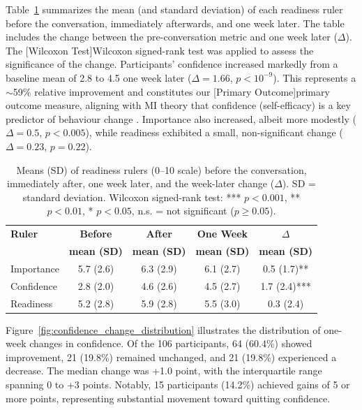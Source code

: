 Table~\ref{table:mibot_ruler_summary} summarizes the mean (and standard deviation) of each readiness ruler before the conversation, immediately afterwards, and one week later.   The table includes the change between the pre-conversation metric and one week later ($\Delta$). The [Wilcoxon Test]Wilcoxon signed-rank test was applied to assess the significance of the change. Participants' confidence increased markedly from a baseline mean of 2.8 to 4.5 one week later ($\Delta=1.66$, $p<10^{-9}$). This represents a $\sim$59\% relative improvement and constitutes our [Primary Outcome]primary outcome measure, aligning with MI theory that confidence (self-efficacy) is a key predictor of behaviour change \citep{Gwaltney2009-wj,Abar2013}. Importance also increased, albeit more modestly ($\Delta=0.5$, $p<0.005$), while readiness exhibited a small, non-significant change ($\Delta=0.23$, $p=0.22$).

\begin{table}[ht!]
  \centering
  \small
  \setlength{\tabcolsep}{4pt}
  \renewcommand{\arraystretch}{1.1}
  \begin{tabular}{@{}lcccc@{}}
    \toprule
    \textbf{Ruler} & \textbf{Before} & \textbf{After} & \textbf{One Week} & \textbf{$\Delta$} \\
    & \textbf{mean (SD)} & \textbf{mean (SD)} & \textbf{mean (SD)} & \textbf{mean (SD)} \\
    \midrule
    Importance & 5.7 (2.6) & 6.3 (2.9) & 6.1 (2.7) & 0.5 (1.7)** \\
    Confidence & 2.8 (2.0) & 4.6 (2.6) & 4.5 (2.7) & 1.7 (2.4)*** \\
    Readiness  & 5.2 (2.8) & 5.9 (2.8) & 5.5 (3.0) & 0.3 (2.4) \\
    \bottomrule
  \end{tabular}
  \caption{Means (SD) of readiness rulers (0--10 scale) before the conversation, immediately after, one week later, and the week-later change ($\Delta$). SD = standard deviation. Wilcoxon signed-rank test: *** $p < 0.001$, ** $p < 0.01$, * $p < 0.05$, n.s. = not significant ($p \geq 0.05$).}
  \label{table:mibot_ruler_summary}
\end{table}

Figure~\ref{fig:confidence_change_distribution} illustrates the distribution of one-week changes in confidence. Of the 106 participants, 64 (60.4\%) showed improvement, 21 (19.8\%) remained unchanged, and 21 (19.8\%) experienced a decrease. The median change was +1.0 point, with the interquartile range spanning 0 to +3 points. Notably, 15 participants (14.2\%) achieved gains of 5 or more points, representing substantial movement toward quitting confidence.

